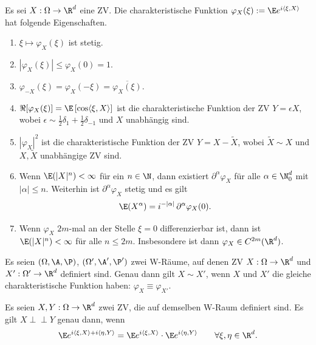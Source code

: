 \documentclass[11pt, a4paper]{article}
\begin{document}
\begin{theorem}\Theorem
    Es sei $X: \Omega \to \R^d$ eine ZV. Die charakteristische Funktion $\varphi_X(\xi) := \E e^{i\langle \xi, X\rangle}$ hat folgende Eigenschaften.
    \begin{enumerate}[label=\alph*)]
        \item $\xi \mapsto \varphi_X(\xi)$ ist stetig.
        \item $|\varphi_X(\xi)| \le \varphi_X(0) = 1$.
        \item $\varphi_{-X}(\xi) = \varphi_X(-\xi) = \overline{\varphi_X(\xi)}$.
        \item $\Re [\varphi_X(\xi)] = \E\left[\cos\langle \xi, X\rangle\right]$ ist die charakteristische Funktion der ZV $Y = \epsilon X$, wobei $\epsilon \sim \frac{1}{2}\delta_1 + \frac{1}{2}\delta_{-1}$ und $X$ unabhängig sind.
        \item $|\varphi_X|^2$ ist die charakteristische Funktion der ZV $Y = X - \widetilde{X}$, wobei $\widetilde{X} \sim X$ und $X, \widetilde{X}$ unabhängige ZV sind.
        
        \item Wenn $\E(|X|^n) < \infty$ für ein $n \in \N$, dann existiert $\partial^\alpha \varphi_X$ für alle $\alpha \in \N_0^d$ mit $|\alpha| \le n$. Weiterhin ist $\partial^\alpha \varphi_X$ stetig und es gilt
        $$\E(X^\alpha) = i^{-|\alpha|} \, \partial^\alpha \varphi_X(0).$$

        \item Wenn $\varphi_X$ $2m$-mal an der Stelle $\xi = 0$ differenzierbar ist, dann ist $\E(|X|^n) < \infty$ für alle $n \le 2m$. Insbesondere ist dann $\varphi_X \in C^{2m}(\R^d)$.
    \end{enumerate}
\end{theorem}

\begin{theorem} \Theorem
    Es seien $(\Omega, \A, \P)$, $(\Omega', \A', \P')$ zwei W-Räume, auf denen ZV $X: \Omega \to \R^d$ und $X': \Omega' \to \R^d$ definiert sind. Genau dann gilt $X \sim X'$, wenn $X$ und $X'$ die gleiche charakteristische Funktion haben: $\varphi_X \equiv \varphi_{X'}$.
\end{theorem}

\begin{corollary} \Theorem
    Es seien $X, Y: \Omega \to \R^d$ zwei ZV, die auf demselben W-Raum definiert sind. Es gilt $X \perp\!\!\!\perp Y$ genau dann, wenn
    $$\E e^{i\langle \xi, X\rangle + i\langle \eta, Y\rangle} = \E e^{i\langle \xi, X\rangle} \cdot \E e^{i\langle \eta, Y\rangle} \qquad \forall \xi, \eta \in \R^d.$$
\end{corollary}
\end{document}
